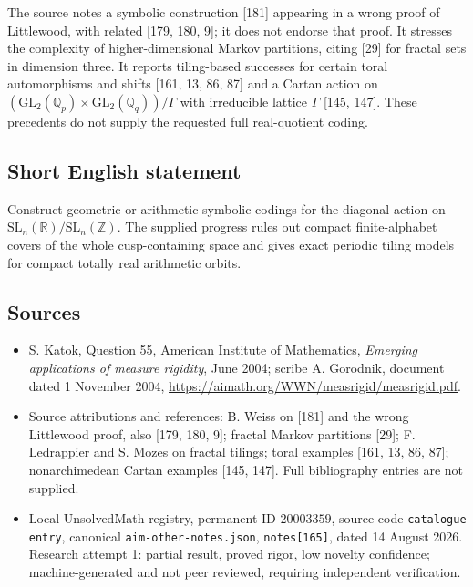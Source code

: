 \documentclass[11pt]{article}
\newcommand{\Z}{\mathbb{Z}}
\newcommand{\Q}{\mathbb{Q}}
\newcommand{\R}{\mathbb{R}}
\begin{document}
The source notes a symbolic construction [181] appearing in a wrong proof of Littlewood, with related [179, 180, 9]; it does not endorse that proof. It stresses the complexity of higher-dimensional Markov partitions, citing [29] for fractal sets in dimension three. It reports tiling-based successes for certain toral automorphisms and shifts [161, 13, 86, 87] and a Cartan action on $(\mathrm{GL}_2(\Q_p)\times\mathrm{GL}_2(\Q_q))/\Gamma$ with irreducible lattice $\Gamma$ [145, 147]. These precedents do not supply the requested full real-quotient coding.
\subsection{Short English statement}
Construct geometric or arithmetic symbolic codings for the diagonal action on $\mathrm{SL}_n(\R)/\mathrm{SL}_n(\Z)$. The supplied progress rules out compact finite-alphabet covers of the whole cusp-containing space and gives exact periodic tiling models for compact totally real arithmetic orbits.
\subsection{Sources}
\begin{itemize}
\item S. Katok, Question 55, American Institute of Mathematics, \emph{Emerging applications of measure rigidity}, June 2004; scribe A. Gorodnik, document dated 1 November 2004, \url{https://aimath.org/WWN/measrigid/measrigid.pdf}.
\item Source attributions and references: B. Weiss on [181] and the wrong Littlewood proof, also [179, 180, 9]; fractal Markov partitions [29]; F. Ledrappier and S. Mozes on fractal tilings; toral examples [161, 13, 86, 87]; nonarchimedean Cartan examples [145, 147]. Full bibliography entries are not supplied.
\item Local UnsolvedMath registry, permanent ID $20003359$, source code \texttt{catalogue entry}, canonical \texttt{aim-other-notes.json}, \texttt{notes[165]}, dated 14 August 2026. Research attempt 1: partial result, proved rigor, low novelty confidence; machine-generated and not peer reviewed, requiring independent verification.
\end{itemize}
\end{document}

